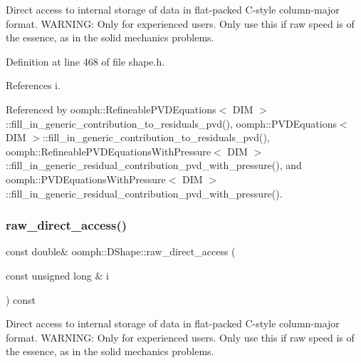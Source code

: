 Direct access to internal storage of data in flat-\/packed C-\/style column-\/major format. W\+A\+R\+N\+I\+NG\+: Only for experienced users. Only use this if raw speed is of the essence, as in the solid mechanics problems. 



Definition at line 468 of file shape.\+h.



References i.



Referenced by oomph\+::\+Refineable\+P\+V\+D\+Equations$<$ D\+I\+M $>$\+::fill\+\_\+in\+\_\+generic\+\_\+contribution\+\_\+to\+\_\+residuals\+\_\+pvd(), oomph\+::\+P\+V\+D\+Equations$<$ D\+I\+M $>$\+::fill\+\_\+in\+\_\+generic\+\_\+contribution\+\_\+to\+\_\+residuals\+\_\+pvd(), oomph\+::\+Refineable\+P\+V\+D\+Equations\+With\+Pressure$<$ D\+I\+M $>$\+::fill\+\_\+in\+\_\+generic\+\_\+residual\+\_\+contribution\+\_\+pvd\+\_\+with\+\_\+pressure(), and oomph\+::\+P\+V\+D\+Equations\+With\+Pressure$<$ D\+I\+M $>$\+::fill\+\_\+in\+\_\+generic\+\_\+residual\+\_\+contribution\+\_\+pvd\+\_\+with\+\_\+pressure().

\mbox{\label{classoomph_1_1DShape_a40a1725b36ba80253bea100c2716abbf}} 
\subsubsection{\texorpdfstring{raw\+\_\+direct\+\_\+access()}{raw\_direct\_access()}\hspace{0.1cm}{\footnotesize\ttfamily [2/2]}}
{\footnotesize\ttfamily const double\& oomph\+::\+D\+Shape\+::raw\+\_\+direct\+\_\+access (\begin{DoxyParamCaption}\item[{const unsigned long \&}]{i }\end{DoxyParamCaption}) const\hspace{0.3cm}{\ttfamily [inline]}}



Direct access to internal storage of data in flat-\/packed C-\/style column-\/major format. W\+A\+R\+N\+I\+NG\+: Only for experienced users. Only use this if raw speed is of the essence, as in the solid mechanics problems. 



